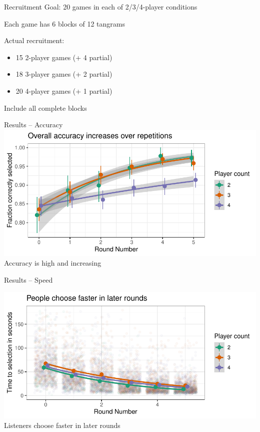 \documentclass[ 12pt, xcolor=beamer,table,usenames,dvipsnames, ignorenonframetext, ngerman]{beamer}
\begin{document}
\begin{frame}{Recruitment}
	Goal: 20 games in each of 2/3/4-player conditions
	
	Each game has 6 blocks of 12 tangrams\pause
	
	\medskip
	
	Actual recruitment:
	\begin{itemize}
		\item 15 2-player games (+ 4 partial)
		\item 18 3-player games (+ 2 partial)
		\item 20 4-player games (+ 1 partial)
	\end{itemize}
Include all complete blocks

\end{frame}


\begin{frame}{Results -- Accuracy}
	\includegraphics[width=\textwidth]{../images/accuracy.pdf}
	Accuracy is high and increasing
\end{frame}

\begin{frame}{Results -- Speed}
	
	\includegraphics[width=\textwidth]{../images/time.pdf}
	Listeners choose faster in later rounds

\end{frame}
\end{document}
